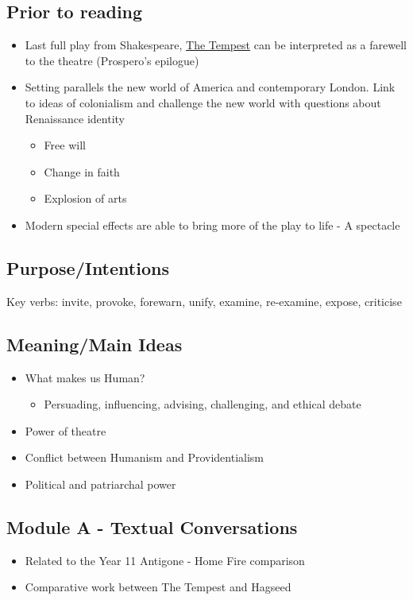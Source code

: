 	\subsection{Prior to reading}
		\begin{itemize}
			\item Last full play from Shakespeare, \underline{The Tempest} can be interpreted as a farewell to the theatre (Prospero's epilogue)
			\item Setting parallels the new world of America and contemporary London. Link to ideas of colonialism and challenge the new world with questions about Renaissance identity
			\begin{itemize}
				\item Free will
				\item Change in faith
				\item Explosion of arts
			\end{itemize}
			\item Modern special effects are able to bring more of the play to life - A spectacle
		\end{itemize}

	\subsection{Purpose/Intentions}
		Key verbs: invite, provoke, forewarn, unify, examine, re-examine, expose, criticise

	\subsection{Meaning/Main Ideas}
		\begin{itemize}
			\item What makes us Human?
			\begin{itemize}
				\item Persuading, influencing, advising, challenging, and ethical debate
			\end{itemize}
			\item Power of theatre
			\item Conflict between Humanism and Providentialism
			\item Political and patriarchal power
		\end{itemize}
	
	\subsection{Module A - Textual Conversations}
		\begin{itemize}
			\item Related to the Year 11 Antigone - Home Fire comparison
			\item Comparative work between The Tempest and Hagseed
		\end{itemize}

